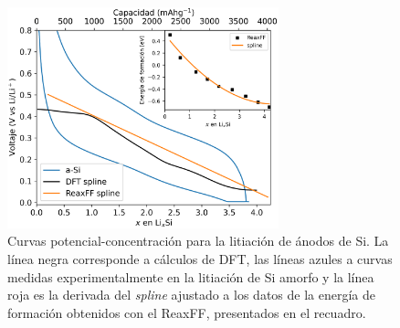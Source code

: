 \begin{figure}[h!]
    \centering
    \includegraphics[width=0.7\textwidth]{Silicio/caracterizacion/resultados/electroquimica/voltaje.png}
    \caption{Curvas potencial-concentración para la litiación de ánodos de Si.
    La línea negra corresponde a cálculos de DFT, las líneas azules a 
    curvas medidas experimentalmente en la litiación de Si amorfo y la línea 
    roja es la derivada del \textit{spline} ajustado a los datos de la energía 
    de formación obtenidos con el ReaxFF, presentados en el recuadro.}
    \label{fig:voltaje}
\end{figure}
